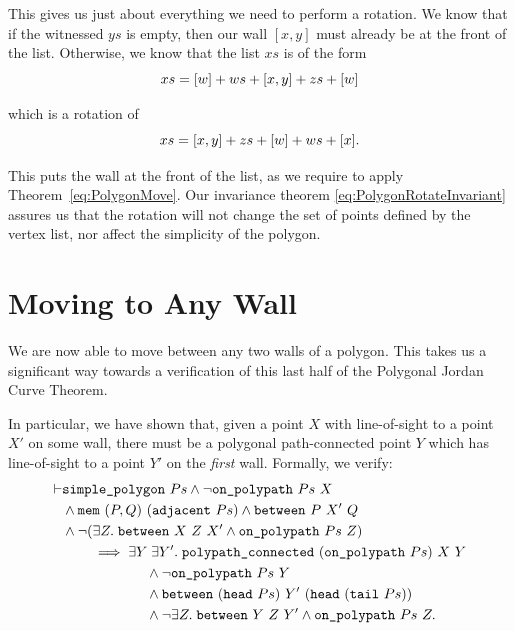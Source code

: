 This gives us just about everything we need to perform a rotation. We know that if the witnessed $ys$ is empty, then our wall $[x,y]$ must already be at the front of the list. Otherwise, we know that the list $xs$ is of the form
\begin{displaymath}
  xs = [w] + ws + [x,y] + zs + [w]
\end{displaymath}

which is a rotation of
\begin{displaymath}
  xs = [x,y] + zs + [w] + ws + [x].
\end{displaymath}

This puts the wall at the front of the list, as we require to apply Theorem~\ref{eq:PolygonMove}. Our invariance theorem \eqref{eq:PolygonRotateInvariant} assures us that the rotation will not change the set of points defined by the vertex list, nor affect the simplicity of the polygon.

\section{Moving to Any Wall}
We are now able to move between any two walls of a polygon. This takes us a significant way towards a verification of this last half of the Polygonal Jordan Curve Theorem. 

In particular, we have shown that, given a point $X$ with line-of-sight to a point $X'$ on some wall, there must be a polygonal path-connected point $Y$ which has line-of-sight to a point $Y'$ on the \emph{first} wall. Formally, we verify:
\begin{equation*}
  \begin{split}
\vdash    &\texttt{simple\_polygon}\ Ps \wedge \neg\texttt{on\_polypath}\ Ps\ X\\
    &\wedge \texttt{mem}\ (P,Q)\ (\texttt{adjacent}\ Ps) \wedge \texttt{between}\ P\ X'\ Q\\
    &\wedge\neg(\exists Z.\; \texttt{between}\ X\ Z\ X' \wedge \texttt{on\_polypath}\ Ps\ Z)\\
    &\qquad\implies \exists Y\;\exists Y'.\; \texttt{polypath\_connected}\ (\texttt{on\_polypath}\ Ps)\ X\ Y\\
    &\qquad\qquad\qquad\wedge\neg\texttt{on\_polypath}\ Ps\ Y\\
    &\qquad\qquad\qquad\wedge \texttt{between}\ (\texttt{head}\ Ps)\ Y'\ (\texttt{head}\ (\texttt{tail}\ Ps))\\
    &\qquad\qquad\qquad\wedge \neg\exists Z.\; \texttt{between}\ Y\ Z\ Y' \wedge \texttt{on\_polypath}\ Ps\ Z.
  \end{split}
\end{equation*}

